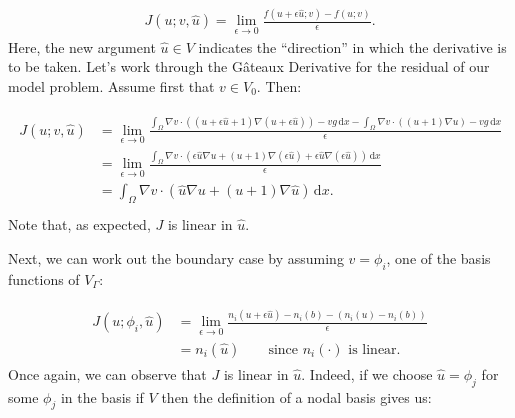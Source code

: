 \documentclass{book}
\begin{document}
\label{\detokenize{8_nonlinear_problems:equation-8_nonlinear_problems:2}}\begin{equation}\label{equation:8_nonlinear_problems:8_nonlinear_problems:2}
\begin{split}J(u; v, \hat{u}) = \lim_{\epsilon\rightarrow 0}\frac{f(u+\epsilon\hat{u}; v)-f(u; v)}{\epsilon}.\end{split}
\end{equation}
Here, the new argument \(\hat{u}\in V\) indicates the “direction” in
which the derivative is to be taken. Let’s work through the Gâteaux
Derivative for the residual of our model problem. Assume first that
\(v\in V_0\). Then:

\label{\detokenize{8_nonlinear_problems:equation-8_nonlinear_problems:3}}\begin{equation}\label{equation:8_nonlinear_problems:8_nonlinear_problems:3}
\begin{split}\begin{split}
J(u; v, \hat{u}) &= \lim_{\epsilon\rightarrow 0}\frac{\displaystyle\int_\Omega \nabla v \cdot \left((u +\epsilon\hat{u} + 1) \nabla (u + \epsilon\hat{u})\right) - vg \, \mathrm{d} x - \displaystyle\int_\Omega \nabla v \cdot \left((u + 1) \nabla u\right) - vg \, \mathrm{d} x}{\epsilon}\\
&= \lim_{\epsilon\rightarrow 0}\frac{\displaystyle\int_\Omega \nabla v \cdot \left(\epsilon\hat{u} \nabla u + (u + 1) \nabla (\epsilon\hat{u}) + \epsilon\hat{u} \nabla (\epsilon\hat{u})\right) \, \mathrm{d} x}{\epsilon}\\
&= \int_\Omega \nabla v \cdot \left(\hat{u} \nabla u + (u + 1) \nabla \hat{u} \right) \, \mathrm{d} x.\\
\end{split}\end{split}
\end{equation}
Note that, as expected, \(J\) is linear in \(\hat{u}\).

Next, we can work out the boundary case by assuming \(v=\phi_i\), one of the basis functions of \(V_\Gamma\):

\label{\detokenize{8_nonlinear_problems:equation-8_nonlinear_problems:4}}\begin{equation}\label{equation:8_nonlinear_problems:8_nonlinear_problems:4}
\begin{split}\begin{split}
J(u; \phi_i, \hat{u}) &= \lim_{\epsilon\rightarrow 0}\frac{n_i(u+\epsilon\hat{u}) - n_i(b) - \left(n_i(u) - n_i(b)\right)}{\epsilon}\\
&= n_i(\hat{u}) \qquad \textrm{since } n_i(\cdot) \textrm{ is linear.}
\end{split}\end{split}
\end{equation}
Once again, we can observe that \(J\) is linear in \(\hat{u}\). Indeed, if
we choose \(\hat{u} = \phi_j\) for some \(\phi_j\) in the basis if \(V\)
then the definition of a nodal basis gives us:
\end{document}
